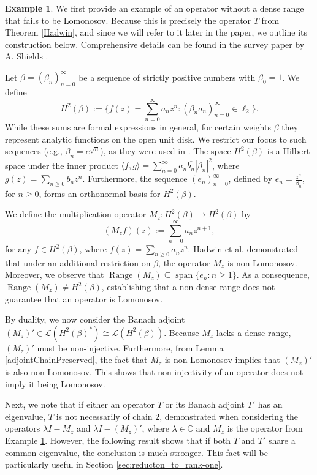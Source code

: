 \documentclass[a4paper,12pt]{article}
\theoremstyle{definition}
\newtheorem{example}[thm]{Example}
\numberwithin{equation}{section}
\numberwithin{thm}{section}
\newcommand{\C}{\mathbb{C}}
\begin{document}
\begin{example}
\label{NonInjectiveNonLomonosov}
We first provide an example of an operator without a dense range that fails to be Lomonosov. Because this is precisely the operator $T$ from Theorem \ref{Hadwin}, and since we will refer to it later in the paper, we outline its construction below. Comprehensive details can be found in the survey paper by A. Shields \cite[Section II]{Shields}. 

Let $\beta=(\beta_n)_{n=0}^\infty$ be a sequence of strictly positive numbers with $\beta_0=1$. We define $$H^2(\beta):=\{f(z) = \sum_{n=0}^\infty a_n z^n: (\beta_na_n)_{n=0}^\infty \in \ell_2\}.$$ 
While these sums are formal expressions in general, for certain weights $\beta$ they represent analytic functions on the open unit disk. We restrict our focus to such sequences (e.g., $\beta_n = e^{\sqrt{n}}$), as they were used in \cite{Hadwin}. The space $H^2(\beta)$ is a Hilbert space under the inner product $\langle f,g\rangle = \sum_{n=0}^\infty a_n\overline{b_n} |\beta_n|^2$, where $g(z)=\sum_{n\geq 0} b_nz^n$. Furthermore, the sequence $(e_n)_{n=0}^\infty$, defined by $e_n = \frac{z^n}{\beta_n}$, for $n\geq 0$, forms an orthonormal basis for $H^2(\beta)$. 

We define the multiplication operator $M_z : H^2(\beta) \rightarrow H^2(\beta)$ by
$$(M_zf)(z) := \sum_{n=0}^\infty a_n z^{n+1},$$
for any $f\in H^2(\beta)$, where $f(z)=\sum_{n\geq 0}a_n z^n$. Hadwin et al. \cite{Hadwin} demonstrated that under an additional restriction on $\beta$, the operator $M_z$ is non-Lomonosov. Moreover, we observe that $\operatorname{Range}(M_z)\subseteq \operatorname{span}\{e_n: n\geq 1\}$. As a consequence, $\overline{\operatorname{Range}(M_z)} \neq H^2(\beta)$, establishing that a non-dense range does not guarantee that an operator is Lomonosov.

By duality, we now consider the Banach adjoint $(M_z)'\in \mathcal{L}(H^2(\beta)^*) \cong \mathcal{L}(H^2(\beta))$. Because $M_z$ lacks a dense range, $(M_z)'$ must be non-injective. Furthermore, from Lemma \ref{adjointChainPreserved}, the fact that $M_z$ is non-Lomonosov implies that $(M_z)'$ is also non-Lomonosov. This shows that non-injectivity of an operator does not imply it being Lomonosov.
\end{example}

Next, we note that if either an operator $T$ or its Banach adjoint $T'$ has an eigenvalue, $T$ is not necessarily of chain $2$, demonstrated when considering the operators $\lambda I - M_z$ and $\lambda I - (M_z)'$, where $\lambda \in \C$ and $M_z$ is the operator from Example \ref{NonInjectiveNonLomonosov}. However, the following result shows that if both $T$ and $T'$ share a common eigenvalue, the conclusion is much stronger. This fact will be particularly useful in Section \ref{sec:reducton_to_rank-one}.
\end{document}
